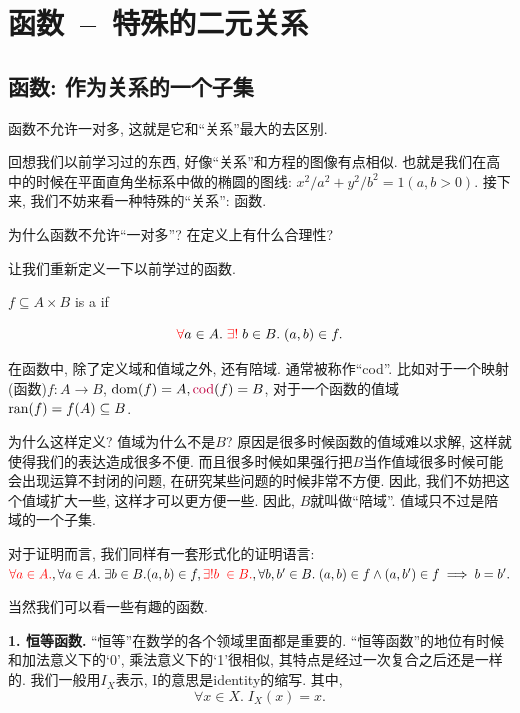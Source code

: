 \section{函数~--~特殊的二元关系}

\subsection{函数: 作为关系的一个子集}

函数不允许一对多, 这就是它和``关系''最大的去区别. 

回想我们以前学习过的东西, 好像``关系''和方程的图像有点相似. 也就是我们在高中的时候在平面直角坐标系中做的椭圆的图线: $x^2/a^2+y^2/b^2=1(a, b>0)$. 接下来, 我们不妨来看一种特殊的``关系'': 函数. 

\begin{bonus}
    为什么函数不允许``一对多''? 在定义上有什么合理性?
\end{bonus}

让我们重新定义一下以前学过的函数. 

\begin{definition}[Function]
    $f \subseteq A \times B$ is a   if

    \[
      \textcolor{red}{\forall} a \in A.\; \textcolor{red}{\exists!} \;b \in B.\; (a, b) \in f.
    \]
\end{definition}

在函数中, 除了定义域和值域之外, 还有陪域. 通常被称作``cod''. 比如对于一个映射(函数)$f: A \to B$, $\text{dom}(f) = A , \textcolor{purple}{\text{cod}}(f) = B$, 对于一个函数的值域$\text{ran}(f) = f(A) \subseteq B$. 

为什么这样定义? 值域为什么不是$B$? 原因是很多时候函数的值域难以求解, 这样就使得我们的表达造成很多不便. 而且很多时候如果强行把$B$当作值域很多时候可能会出现运算不封闭的问题, 在研究某些问题的时候非常不方便. 因此, 我们不妨把这个值域扩大一些, 这样才可以更方便一些. 因此, $B$就叫做``陪域''. 值域只不过是陪域的一个子集. 

对于证明而言, 我们同样有一套形式化的证明语言: 
$\textcolor{red}{\forall a \in A.}, \forall a \in A.\; \exists b \in B. (a, b) \in f, \textcolor{red}{\exists! b \;\in B.}, \forall b, b' \in B.\; (a, b) \in f \land (a, b') \in f \implies b = b'.$

当然我们可以看一些有趣的函数. 

\textbf{1. 恒等函数. } ``恒等''在数学的各个领域里面都是重要的. ``恒等函数''的地位有时候和加法意义下的`0', 乘法意义下的`1'很相似, 其特点是经过一次复合之后还是一样的. 我们一般用$I_X$表示, I的意思是identity的缩写. 其中, 
$$\forall x \in X.\; I_{X}(x) = x.$$


